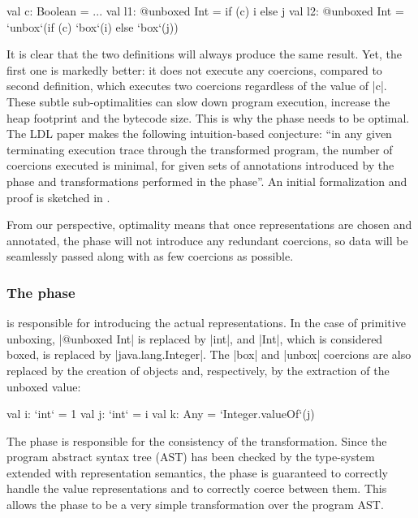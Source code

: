 \begin{lstlisting-nobreak}
val c: Boolean = ...
val l1: @unboxed Int = if (c) i else j
val l2: @unboxed Int = `unbox`(if (c) `box`(i) else `box`(j))
\end{lstlisting-nobreak}

It is clear that the two definitions will always produce the same
result. Yet, the first one is markedly better: it does not execute
any coercions, compared to second definition, which executes two
coercions regardless of the value of |c|. These subtle
sub-optimalities can slow down program execution, increase the heap
footprint and the bytecode size. This is why the \coerce{} phase needs
to be optimal. The LDL paper \cite{ldl} makes the following
intuition-based conjecture: ``in any given terminating
execution trace through the transformed program, the number of
coercions executed is minimal,
for given sets of annotations introduced by
the \inject{} phase and transformations performed in the \commit{}
phase''. An initial formalization and proof is sketched in \cite{ldl-form}.

From our perspective, optimality means that once representations are chosen and annotated,
the \coerce{} phase will not introduce any redundant coercions, so data will be seamlessly passed along with as few coercions as possible.

\vspace{-0.3em}
\subsubsection{The \commit{} phase} is responsible for introducing the actual
representations. In the case of primitive unboxing, |@unboxed Int| is
replaced by |int|, and |Int|, which is considered boxed, is replaced
by |java.lang.Integer|. The |box| and |unbox| coercions are also
replaced by the creation of objects and, respectively, by the
extraction of the unboxed value:

\vspace{-0.4em}
\begin{lstlisting-nobreak}
val i: `int` = 1
val j: `int` = i
val k: Any = `Integer.valueOf`(j)
\end{lstlisting-nobreak}

The \commit{} phase is responsible for the consistency of the transformation. Since the program abstract syntax tree (AST) has been checked by the type-system extended with representation semantics, the \commit{} phase is guaranteed to correctly handle the value representations and to correctly coerce between them. This allows the \commit{} phase to be a very simple transformation over the program AST.

